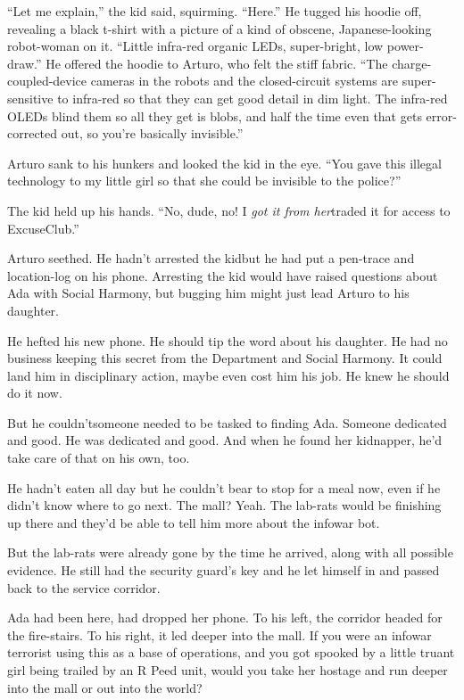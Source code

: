 “Let me explain,” the kid said, squirming. “Here.” He tugged his
hoodie off, revealing a black t-shirt with a picture of a kind of
obscene, Japanese-looking robot-woman on it. “Little infra-red
organic LEDs, super-bright, low power-draw.” He offered the hoodie
to Arturo, who felt the stiff fabric. “The charge-coupled-device
cameras in the robots and the closed-circuit systems are
super-sensitive to infra-red so that they can get good detail in
dim light. The infra-red OLEDs blind them so all they get is blobs,
and half the time even that gets error-corrected out, so you’re
basically invisible.”

Arturo sank to his hunkers and looked the kid in the eye. “You gave
this illegal technology to my little girl so that she could be
invisible to the police?”

The kid held up his hands. “No, dude, no! I
\emph{got it from her}{\dash}traded it for access to ExcuseClub.”

\tb

Arturo seethed. He hadn’t arrested the kid{\dash}but he had put a
pen-trace and location-log on his phone. Arresting the kid would
have raised questions about Ada with Social Harmony, but bugging
him might just lead Arturo to his daughter.

He hefted his new phone. He should tip the word about his daughter.
He had no business keeping this secret from the Department and
Social Harmony. It could land him in disciplinary action, maybe
even cost him his job. He knew he should do it now.

But he couldn’t{\dash}someone needed to be tasked to finding Ada. Someone
dedicated and good. He was dedicated and good. And when he found
her kidnapper, he’d take care of that on his own, too.

He hadn’t eaten all day but he couldn’t bear to stop for a meal
now, even if he didn’t know where to go next. The mall? Yeah. The
lab-rats would be finishing up there and they’d be able to tell him
more about the infowar bot.

But the lab-rats were already gone by the time he arrived, along
with all possible evidence. He still had the security guard’s key
and he let himself in and passed back to the service corridor.

Ada had been here, had dropped her phone. To his left, the corridor
headed for the fire-stairs. To his right, it led deeper into the
mall. If you were an infowar terrorist using this as a base of
operations, and you got spooked by a little truant girl being
trailed by an R Peed unit, would you take her hostage and run
deeper into the mall or out into the world?

